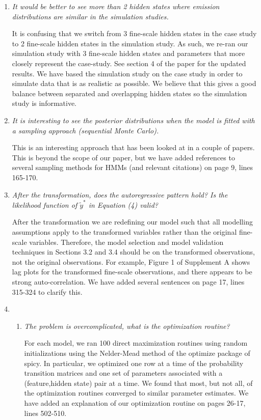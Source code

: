 \documentclass{article}
\begin{document}
\begin{enumerate}
    \item \textit{It would be better to see more than 2 hidden states where emission distributions are similar in the simulation studies.} 
    
    It is confusing that we switch from 3 fine-scale hidden states in the case study to 2 fine-scale hidden states in the simulation study. As such, we re-ran our simulation study with 3 fine-scale hidden states and parameters that more closely represent the case-study. See section 4 of the paper for the updated results.  We have based the simulation study on the case study in order to simulate data that is as realistic as possible. We believe that this gives a good balance between separated and overlapping hidden states so the simulation study is informative.
    
    \item \textit{It is interesting to see the posterior distributions when the model is fitted with a sampling approach (sequential Monte Carlo).} 
    
    This is an interesting approach that has been looked at in a couple of papers. This is beyond the scope of our paper, but we have added references to several sampling methods for HMMs (and relevant citations) on page 9, lines 165-170.
    
    \item \textit{After the transformation, does the autoregressive pattern hold? Is the likelihood function of $\tilde y^*$ in Equation (4) valid?} 
    
    After the transformation we are redefining our model such that all modelling assumptions apply to the transformed variables rather than the original fine-scale variables. Therefore, the model selection and model validation techniques in Sections 3.2 and 3.4 should be  on the transformed observations, not the original observations. For example, Figure 1 of Supplement A shows lag plots for the transformed fine-scale observations, and there appears to be strong auto-correlation. We have added several sentences on page 17, lines 315-324 to clarify this.
    
    \item \begin{enumerate}
        \item \textit{The problem is overcomplicated, what is the optimization routine? } 
        
        For each model, we ran 100 direct maximization routines using random initializations using the Nelder-Mead method of the optimize package of spicy. In particular, we optimized one row at a time of the probability transition matrices and one set of parameters associated with a (feature,hidden state) pair at a time. We found that most, but not all, of the optimization routines converged to similar parameter estimates. We have added an explanation of our optimization routine on pages 26-17, lines 502-510.
        

\end{enumerate}
\end{enumerate}
\end{document}
